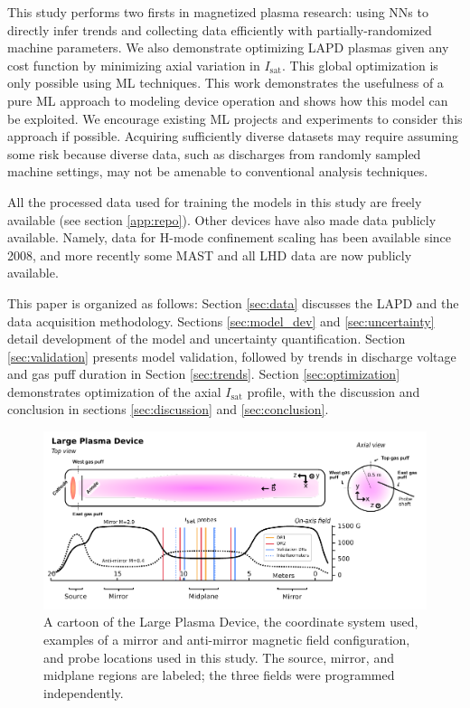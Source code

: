 This study performs two firsts in magnetized plasma research: using NNs to directly infer trends and collecting data efficiently with partially-randomized machine parameters. We also demonstrate optimizing LAPD plasmas given any cost function by minimizing axial variation in $I_\text{sat}$. This global optimization is only possible using ML techniques. This work demonstrates the usefulness of a pure ML approach to modeling device operation and shows how this model can be exploited. We encourage existing ML projects and experiments to consider this approach if possible. Acquiring sufficiently diverse datasets may require assuming some risk because diverse data, such as discharges from randomly sampled machine settings, may not be amenable to conventional analysis techniques.

%
All the processed data used for training the models in this study are freely available\cite{phil_travis_2025_15007853} (see section \ref{app:repo}). Other devices have also made data publicly available. Namely, data for H-mode confinement scaling has been available since 2008\cite{roach_2008_2008}, and more recently some MAST\cite{jackson_fair-mast_2024} and all LHD\cite{lhd_data} data are now publicly available.  

This paper is organized as follows: Section \ref{sec:data} discusses the LAPD and the data acquisition methodology. Sections \ref{sec:model_dev} and \ref{sec:uncertainty} detail development of the model and uncertainty quantification. Section \ref{sec:validation} presents model validation, followed by trends in discharge voltage and gas puff duration in Section \ref{sec:trends}. Section \ref{sec:optimization} demonstrates optimization of the axial $I_\text{sat}$ profile, with the discussion and conclusion in sections \ref{sec:discussion} and \ref{sec:conclusion}.

\begin{figure}
	\centering
	\includegraphics[width=\textwidth]{figures/LAPD+coordinates.pdf}
	\caption[size=12]{\label{fig:LAPD_coords}A cartoon of the Large Plasma Device, the coordinate system used, examples of a mirror and anti-mirror magnetic field configuration, and probe locations used in this study. The source, mirror, and midplane regions are labeled; the three fields were programmed independently.}
\end{figure}

